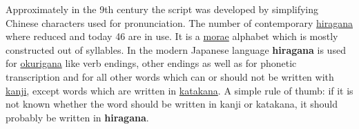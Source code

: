 

Approximately in the 9th century the \lhiragana{} script was developed by
simplifying Chinese characters used for pronunciation. The number of
contemporary \hyperref[sec:Hiragana]{hiragana} where reduced and today 46 are
in use. It is a \hyperref[sec:Mora]{morae} alphabet which is mostly constructed
out of syllables. In the modern Japanese language \textbf{hiragana} is used for
\hyperref[sec:Okurigana]{okurigana} like verb endings, other endings as well as
for phonetic transcription and for all other words which can or should not be
written with \hyperref[sec:Kanji]{kanji}, except words which are written in
\hyperref[sec:Katakana]{katakana}. A simple rule of thumb: if it is not known
whether the word should be written in kanji or katakana, it should probably be
written in \textbf{hiragana}.
